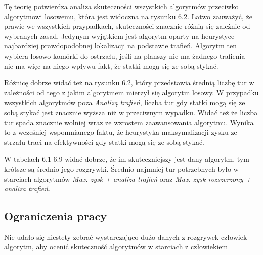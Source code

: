 Tę teorię potwierdza analiza skuteczności wszystkich algorytmów przeciwko algorytmowi losowemu, która jest widoczna na rysunku 6.2. Łatwo zauważyć, że prawie we wszystkich przypadkach, skuteczności  znacznie różnią się zależnie od wybranych zasad. Jedynym wyjątkiem jest algorytm oparty na heurystyce najbardziej prawdopodobnej lokalizacji na podstawie trafień. Algorytm ten wybiera losowo komórki do ostrzału, jeśli na planszy nie ma żadnego trafienia - nie ma więc na niego wpływu fakt, że statki mogą się ze sobą stykać.

Różnicę dobrze widać też na rysunku 6.2, który przedstawia średnią liczbę tur w zależności od tego z jakim algorytmem mierzył się algorytm losowy. W przypadku wszystkich algorytmów poza \emph{Analizą trafień}, liczba tur gdy statki mogą się ze sobą stykać jest znacznie wyższa niż w przeciwnym wypadku. Widać też że liczba tur spada znacznie wolniej wraz ze wzrostem zaawansowania algorytmu. Wynika to z wcześniej wspomnianego faktu, że heurystyka maksymalizacji zysku ze strzału traci na efektywności gdy statki mogą się ze sobą stykać.

W tabelach 6.1-6.9 widać dobrze, że im skuteczniejszy jest dany algorytm, tym krótsze są średnio jego rozgrywki. Średnio najmniej tur potrzebnych było w starciach algorytmów \emph{Max. zysk + analiza trafień} oraz \emph{Max. zysk rozszerzony + analiza trafień}.


\subsection{Ograniczenia pracy}
Nie udało się niestety zebrać wystarczająco dużo danych z rozgrywek człowiek-algorytm, aby ocenić skuteczność algorytmów w starciach z człowiekiem
